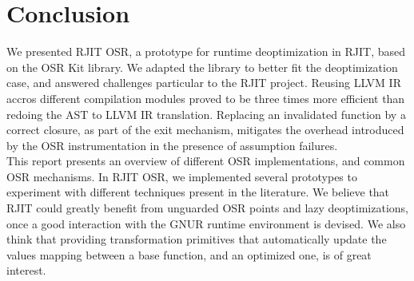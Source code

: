 
\chapter{Conclusion} %

\label{Chapter6} %


\newcommand{\keyword}[1]{\textbf{#1}}
\newcommand{\tabhead}[1]{\textbf{#1}}
\newcommand{\code}[1]{\texttt{#1}}
\newcommand{\file}[1]{\texttt{\bfseries#1}}
\newcommand{\option}[1]{\texttt{\itshape#1}}


  

We presented RJIT OSR, a prototype for runtime deoptimization in RJIT, based on the OSR Kit library\cite{OSRKit}.
We adapted the library to better fit the deoptimization case, and answered challenges particular to the RJIT project.
Reusing LLVM IR accros different compilation modules proved to be three times more efficient than redoing the AST to LLVM IR translation.
Replacing an invalidated function by a correct closure, as part of the exit mechanism, mitigates the overhead introduced by the OSR instrumentation in the presence of assumption failures.\\

This report presents an overview of different OSR implementations, and common OSR mechanisms.
In RJIT OSR, we implemented several prototypes to experiment with different techniques present in the literature.
We believe that RJIT could greatly benefit from unguarded OSR points and lazy deoptimizations, once a good interaction with the GNUR runtime environment is devised.
We also think that providing transformation primitives that automatically update the values mapping between a base function, and an optimized one, is of great interest.\\

